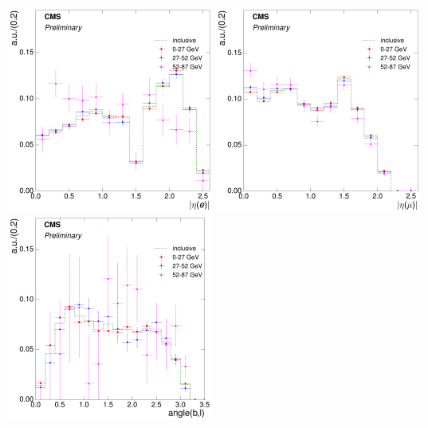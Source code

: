 \begin{figure}[hbtp]
    \centering
     \includegraphics[width=0.48\textwidth]{Chapters/04_Analysis/04b_XSections/images/8TeV/fit_variables/electron/MET/electron_absolute_eta/qcd/MET_electron_absolute_eta_0orMoreBtag_QCD_template_comparison.pdf}\hfill
     \includegraphics[width=0.48\textwidth]{Chapters/04_Analysis/04b_XSections/images/8TeV/fit_variables/muon/MET/muon_absolute_eta/qcd/MET_muon_absolute_eta_0orMoreBtag_QCD_template_comparison.pdf}\\
     \includegraphics[width=0.48\textwidth]{Chapters/04_Analysis/04b_XSections/images/8TeV/fit_variables/electron/MET/angle_bl/qcd/MET_angle_bl_1orMoreBtag_QCD_template_comparison.pdf}\hfill

\end{figure}
